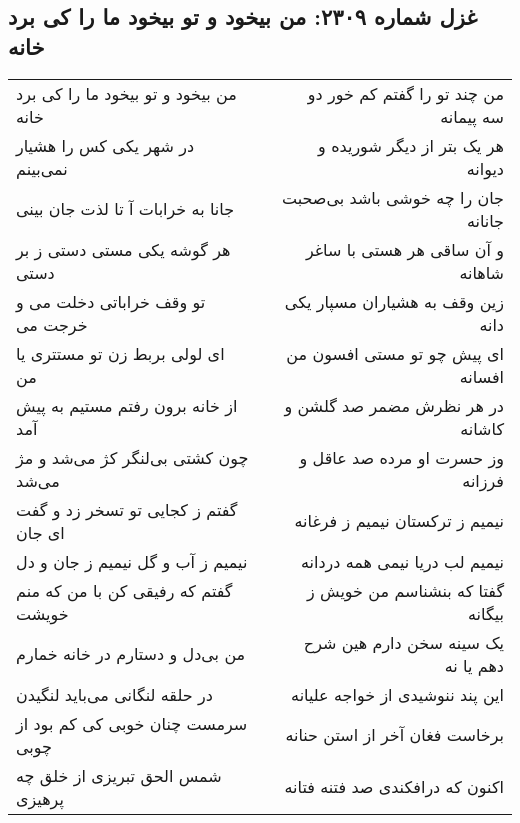 \begin{center}
\section*{غزل شماره ۲۳۰۹: من بیخود و تو بیخود ما را کی برد خانه}
\label{sec:2309}
\begin{longtable}{l p{0.5cm} r}
من بیخود و تو بیخود  ما را کی برد خانه
&&
من چند تو را  گفتم کم خور دو سه پیمانه
\\
در شهر یکی کس را هشیار نمی‌بینم
&&
هر یک بتر از دیگر شوریده و دیوانه
\\
جانا به خرابات آ تا لذت جان بینی
&&
جان را چه خوشی باشد بی‌صحبت جانانه
\\
هر گوشه یکی مستی دستی ز بر دستی
&&
و آن ساقی هر هستی با ساغر شاهانه
\\
تو وقف خراباتی دخلت می و خرجت می
&&
زین وقف به هشیاران مسپار یکی دانه
\\
ای لولی بربط زن تو مستتری یا من
&&
ای پیش چو تو مستی افسون من افسانه
\\
از خانه برون رفتم مستیم به پیش آمد
&&
در هر نظرش مضمر صد گلشن و کاشانه
\\
چون کشتی بی‌لنگر کژ می‌شد و مژ می‌شد
&&
وز حسرت او مرده صد عاقل و فرزانه
\\
گفتم ز کجایی تو تسخر زد و گفت ای جان
&&
نیمیم ز ترکستان نیمیم ز فرغانه
\\
نیمیم ز آب و گل نیمیم ز جان و دل
&&
نیمیم لب دریا نیمی همه دردانه
\\
گفتم که رفیقی کن با من که منم خویشت
&&
گفتا که بنشناسم من خویش ز بیگانه
\\
من بی‌دل و دستارم در خانه خمارم
&&
یک سینه سخن دارم هین شرح دهم یا نه
\\
در حلقه لنگانی می‌باید لنگیدن
&&
این پند ننوشیدی از خواجه علیانه
\\
سرمست چنان خوبی کی کم بود از چوبی
&&
برخاست فغان آخر از استن حنانه
\\
شمس الحق تبریزی از خلق چه پرهیزی
&&
اکنون که درافکندی صد فتنه فتانه
\\
\end{longtable}
\end{center}
